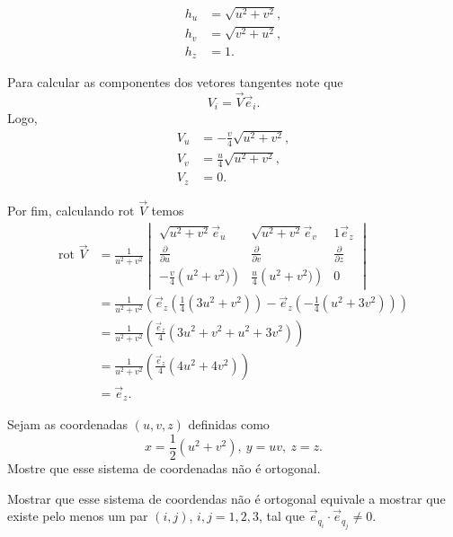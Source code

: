 \documentclass[a4paper,12pt, leqno, answers]{exam}
\newcommand{\devp}[2]{\frac{\partial #1}{\partial #2}}
\newcommand{\rot}{\mbox{rot }}
\begin{document}
\begin{questions}
\begin{solution}
        \begin{align*}
              h_u &= \sqrt{u^2 + v^2}, \\
              h_v &= \sqrt{v^2 + u^2}, \\
              h_z &= 1.
        \end{align*}
  
        Para calcular as componentes dos vetores tangentes note que
        \[
        V_i = \vec{V} \vec{e}_i.
        \]
        Logo,
        \begin{align*}
            V_u &= -\frac{v}{4} \sqrt{u^2 + v^2}, \\
            V_v &= \frac{u}{4} \sqrt{u^2 + v^2}, \\
            V_z &= 0.
        \end{align*}
         
        Por fim, calculando $\rot \vec{V}$ temos
        \begin{align*}
            \rot \vec{V} &= \frac{1}{u^2 + v^2} \begin{vmatrix}
                \sqrt{u^2 + v^2} \vec{e}_{u} & \sqrt{u^2 + v^2} \vec{e}_{v} & 1 \vec{e}_{z} \\
                \devp{}{u}      & \devp{}{v}      & \devp{}{z}      \\
                -\frac{v}{4} \left(u^2 + v^2)\right) & \frac{u}{4} \left(u^2 + v^2)\right) & 0           
            \end{vmatrix} \\
            &= \frac{1}{u^2 + v^2} \left(\vec{e}_z \left(\frac{1}{4}\left(3u^2 + v^2\right)\right) - \vec{e}_z \left(-\frac{1}{4}\left(u^2 + 3v^2\right)\right)\right) \\
            &= \frac{1}{u^2 + v^2}\left(\frac{\vec{e}_z}{4}\left(3u^2 + v^2 + u^2 + 3v^2\right)\right) \\
            &= \frac{1}{u^2 + v^2}\left(\frac{\vec{e}_z}{4}\left(4u^2 + 4v^2\right)\right) \\
            &= \vec{e}_z.
        \end{align*}
    \end{solution}
  
    \question Sejam as coordenadas $(u, v, z)$ definidas como
    \[
    x = \frac{1}{2} (u^2 + v^2), \ y = uv, \ z = z.
    \]
    Mostre que esse sistema de coordenadas n\~{a}o \'{e} ortogonal.
    \begin{solution}
        Mostrar que esse sistema de coordendas n\~{a}o \'{e} ortogonal equivale a mostrar que existe pelo menos um par $(i,j)$, $i, j = 1, 2, 3$, tal que $\vec{e}_{q_i} \cdot \vec{e}_{q_j} \neq 0$.
  

\end{solution}
\end{questions}
\end{document}
